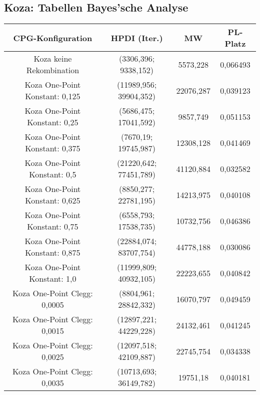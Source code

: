 \subsection{Koza: Tabellen Bayes'sche Analyse}
\label{subsec:appendixTabellenBayesKoza}
\begin{table}[H]
	\centering
	\begin{tabular}{c | c | c | c}
		\textbf{CPG-Konfiguration} & \textbf{HPDI (Iter.)} & \textbf{MW} & \textbf{PL-Platz}\\
		\hline
		Koza keine Rekombination & (\color{Green}3306,396\color{black}; \color{Green}9338,152\color{black}) & \color{Green}5573,228\color{black} & \color{Green}0,066493\color{black}\\
		\hline
		\hline
		Koza One-Point Konstant: 0,125 & (11989,956; 39904,352) & 22076,287 & 0,039123\\
		\hline
		Koza One-Point Konstant: 0,25 & (\color{Green}5686,475\color{black}; \color{Green}17041,592\color{black}) & \color{Green}9857,749\color{black} & \color{Green}0,051153\color{black}\\
		\hline
		Koza One-Point Konstant: 0,375 & (7670,19; 19745,987) & 12308,128 & 0,041469\\
		\hline
		Koza One-Point Konstant: 0,5 & (\color{red}21220,642\color{black}; \color{red}77451,789\color{black}) & \color{red}41120,884\color{black} & \color{red}0,032582\color{black}\\
		\hline
		Koza One-Point Konstant: 0,625 & (8850,277; 22781,195) & 14213,975 & 0,040108\\
		\hline
		Koza One-Point Konstant: 0,75 & (6558,793; 17538,735) & 10732,756 & 0,046386\\
		\hline
		Koza One-Point Konstant: 0,875 & (\color{red}22884,074\color{black}; \color{red}83707,754\color{black}) & \color{red}44778,188\color{black} & \color{red}0,030086\color{black}\\
		\hline
		Koza One-Point Konstant: 1,0 & (11999,809; 40932,105) & 22223,655 & 0,040842\\
		\hline
		\hline
		Koza One-Point Clegg: 0,0005 & (8804,961; 28842,332) & 16070,797 & 0,049459\\
		\hline
		Koza One-Point Clegg: 0,0015 & (\color{red}12897,221\color{black}; \color{red}44229,228\color{black}) & \color{red}24132,461\color{black} & 0,041245\\
		\hline
		Koza One-Point Clegg: 0,0025 & (12097,518; 42109,887) & 22745,754 & \color{red}0,034338\color{black}\\
		\hline
		Koza One-Point Clegg: 0,0035 & (10713,693; 36149,782) & 19751,18 & 0,040181\\

\end{tabular}
\end{table}
